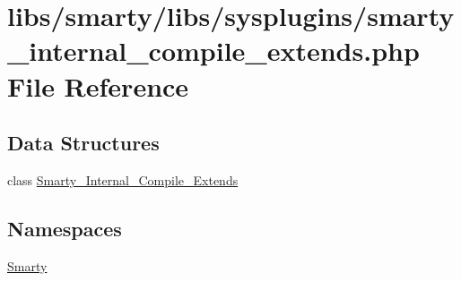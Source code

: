 \hypertarget{smarty__internal__compile__extends_8php}{}\section{libs/smarty/libs/sysplugins/smarty\+\_\+internal\+\_\+compile\+\_\+extends.php File Reference}
\label{smarty__internal__compile__extends_8php}
\subsection*{Data Structures}
\begin{DoxyCompactItemize}
\item 
class \hyperlink{class_smarty___internal___compile___extends}{Smarty\+\_\+\+Internal\+\_\+\+Compile\+\_\+\+Extends}
\end{DoxyCompactItemize}
\subsection*{Namespaces}
\begin{DoxyCompactItemize}
\item 
 \hyperlink{namespace_smarty}{Smarty}
\end{DoxyCompactItemize}
